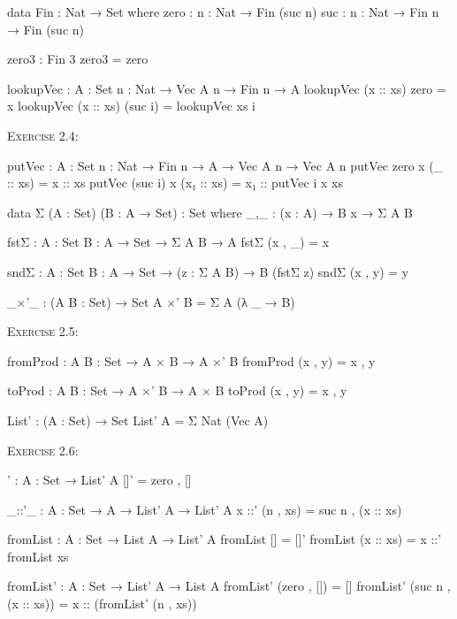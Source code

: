 \documentclass{article}
\begin{document}
\begin{code}
data Fin : Nat → Set where
    zero : {n : Nat} → Fin (suc n)
    suc : {n : Nat} → Fin n → Fin (suc n)

zero3 : Fin 3
zero3 = zero

lookupVec : {A : Set} {n : Nat} → Vec A n → Fin n → A
lookupVec (x :: xs) zero = x
lookupVec (x :: xs) (suc i) = lookupVec xs i
\end{code}

\noindent
\textsc{Exercise 2.4}:

\begin{code}
putVec : {A : Set} {n : Nat} → Fin n → A → Vec A n → Vec A n
putVec zero x (_ :: xs) = x :: xs
putVec (suc i) x (x₁ :: xs) = x₁ :: putVec i x xs
\end{code}

\begin{code}
data Σ (A : Set) (B : A → Set) : Set where
    _,_ : (x : A) → B x → Σ A B

fstΣ : {A : Set} {B : A → Set} → Σ A B → A
fstΣ (x , _) = x

sndΣ : {A : Set} {B : A → Set} → (z : Σ A B) → B (fstΣ z)
sndΣ (x , y) = y

_×'_ : (A B : Set) → Set
A ×' B = Σ A (λ _ → B)
\end{code}

\noindent
\textsc{Exercise 2.5}:

\begin{code}
fromProd : {A B : Set} → A × B → A ×' B
fromProd (x , y) = x , y

toProd : {A B : Set} → A ×' B → A × B
toProd (x , y) = x , y
\end{code}

\begin{code}
List' : (A : Set) → Set
List' A = Σ Nat (Vec A)
\end{code}

\noindent
\textsc{Exercise 2.6}:

\begin{code}
[]' : {A : Set} → List' A
[]' = zero , []

_::'_ : {A : Set} → A → List' A → List' A
x ::' (n , xs) = suc n , (x :: xs)

fromList : {A : Set} → List A → List' A
fromList [] = []'
fromList (x :: xs) = x ::' fromList xs

fromList' : {A : Set} → List' A → List A
fromList' (zero , []) = []
fromList' (suc n , (x :: xs)) = x :: (fromList' (n , xs))
\end{code}
\end{document}
